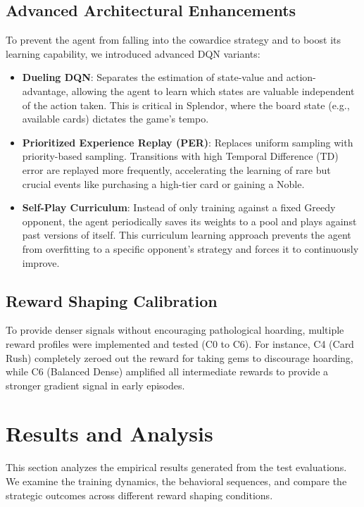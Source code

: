 \documentclass[11pt]{article}
\begin{document}
\subsection{Advanced Architectural Enhancements}
To prevent the agent from falling into the cowardice strategy and to boost its learning capability, we introduced advanced DQN variants:
\begin{itemize}
    \item \textbf{Dueling DQN}: Separates the estimation of state-value and action-advantage, allowing the agent to learn which states are valuable independent of the action taken. This is critical in Splendor, where the board state (e.g., available cards) dictates the game's tempo.
    \item \textbf{Prioritized Experience Replay (PER)}: Replaces uniform sampling with priority-based sampling. Transitions with high Temporal Difference (TD) error are replayed more frequently, accelerating the learning of rare but crucial events like purchasing a high-tier card or gaining a Noble.
    \item \textbf{Self-Play Curriculum}: Instead of only training against a fixed Greedy opponent, the agent periodically saves its weights to a pool and plays against past versions of itself. This curriculum learning approach prevents the agent from overfitting to a specific opponent's strategy and forces it to continuously improve.
\end{itemize}

\subsection{Reward Shaping Calibration}
To provide denser signals without encouraging pathological hoarding, multiple reward profiles were implemented and tested (C0 to C6). For instance, C4 (Card Rush) completely zeroed out the reward for taking gems to discourage hoarding, while C6 (Balanced Dense) amplified all intermediate rewards to provide a stronger gradient signal in early episodes.

\section{Results and Analysis}
This section analyzes the empirical results generated from the test evaluations. We examine the training dynamics, the behavioral sequences, and compare the strategic outcomes across different reward shaping conditions.
\end{document}
